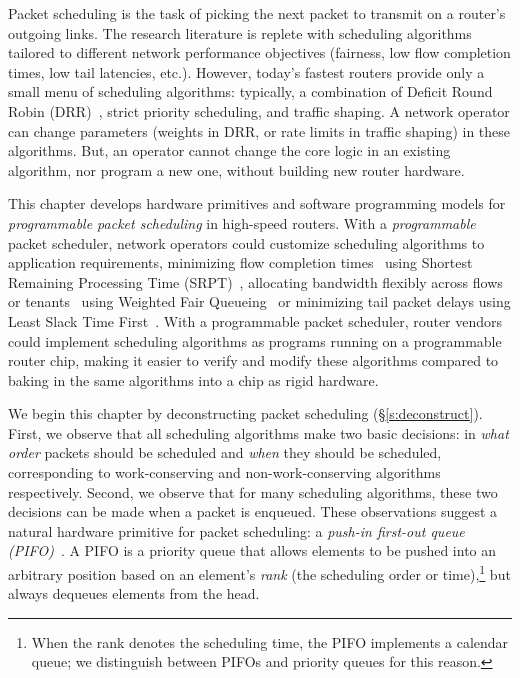Packet scheduling is the task of picking the next packet to transmit on a
router's outgoing links. The research literature is replete with scheduling
algorithms~\cite{wfq, srr, lstf, drr, pFabric} tailored to different network
performance objectives (\eg fairness, low flow completion times, low tail
latencies, etc.).  However, today's fastest routers provide only a small menu
of scheduling algorithms: typically, a combination of Deficit Round Robin
(DRR)~\cite{drr}, strict priority scheduling, and traffic shaping. A network
operator can change parameters (\eg weights in DRR, or rate limits in traffic
shaping) in these algorithms. But, an operator cannot change the core logic in
an existing algorithm, nor program a new one, without building new router
hardware.

 This chapter develops hardware primitives and software programming models for
{\em programmable packet scheduling} in high-speed routers. With a {\em
programmable} packet scheduler, network operators could customize scheduling
algorithms to application requirements, \eg minimizing flow completion
times~\cite{pFabric} using Shortest Remaining Processing Time (SRPT)~\cite{srpt},
allocating bandwidth flexibly across flows or tenants~\cite{eyeq, faircloud}
using Weighted Fair Queueing~\cite{wfq} or minimizing tail packet delays using
Least Slack Time First~\cite{lstf}.  With a programmable packet scheduler,
router vendors could implement scheduling algorithms as programs running on a
programmable router chip, making it easier to verify and modify these
algorithms compared to baking in the same algorithms into a chip as rigid
hardware.

We begin this chapter by deconstructing packet scheduling
(\S\ref{s:deconstruct}). First, we observe that all scheduling algorithms make
two basic decisions: in {\em what order} packets should be scheduled and {\em
when} they should be scheduled, corresponding to work-conserving and
non-work-conserving algorithms respectively.  Second, we observe that for many
scheduling algorithms, these two decisions can be made when a packet is
enqueued. These observations suggest a natural hardware primitive for packet
scheduling: a {\em push-in first-out queue (PIFO)}~\cite{pifo}. A PIFO is a
priority queue that allows elements to be pushed into an arbitrary position
based on an element's {\em rank} (the scheduling order or time),\footnote{When
the rank denotes the scheduling time, the PIFO implements a calendar queue; we
distinguish between PIFOs and priority queues for this reason.} but always
dequeues elements from the head.

